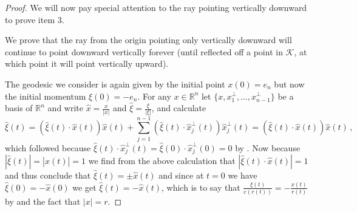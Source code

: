 \documentclass[
	fontsize=11pt, 
	twoside=false, 
	abstract=true, 
	a4paper,
]{scrartcl}
\newcommand{\RR}{\mathbb{R}}
\newcommand{\abs}[1]{\left\lvert#1\right\rvert}
\begin{document}
\begin{proof}
	We will now pay special attention to the ray pointing vertically downward to prove item 3.

%
%


	We prove that the ray from the origin pointing only vertically downward will continue to point downward vertically forever (until reflected off a point in $\mathcal{K}$, at which point it will point vertically upward). 

	The geodesic we consider is again given by the initial point $x(0)=e_n$ but now the initial momentum $\xi(0) = -e_n$. For any $x \in \RR^n$ let $\{x,x^\perp_1,\dots,x^\perp_{n-1}\}$ be a basis of $\RR^n$ and write $\hat x = \frac{x}{\abs{x}}$ and $\hat \xi = \frac{\xi}{\abs{\xi}}$, and calculate
	\[
		\hat \xi (t) = (\hat \xi(t) \cdot \hat x(t)) \hat x(t) + \sum_{j=1}^{n-1}(\hat \xi(t) \cdot \hat x^\perp_j(t)) \hat x_j^\perp(t) = (\hat \xi(t) \cdot \hat x(t)) \hat x(t)\,,
	\]
	which followed because $\hat \xi(t) \cdot \hat x^\perp_j (t) = \hat \xi(0) \cdot \hat x^\perp_j (0) = 0$ by \cite[Eq.~(2.8)]{zbMATH07625517}. Now because $\abs{\hat \xi(t)} =\abs{\hat x(t)} = 1$ we find from the above calculation that $\abs{\hat \xi(t)\cdot \hat x(t)} = 1$ and thus conclude that $\hat \xi(t) = \pm \hat x(t)$ and since at $t=0$ we have $\hat \xi(0) = -\hat x(0)$ we get $\hat \xi(t) = -\hat x(t)$, which is to say that $\frac{\xi(t)}{c(r(t))} = -\frac{x(t)}{r(t)}$ by \cite[Eq.~(2.7)]{zbMATH07625517} and the fact that $\abs{x} = r$. 


\end{proof}
\end{document}
